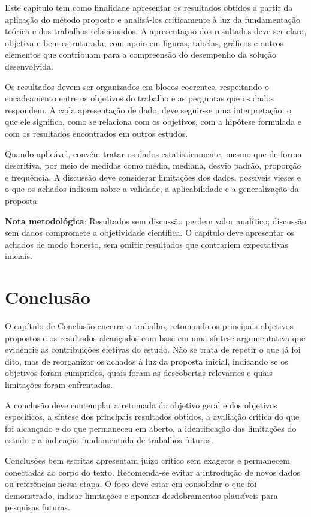 \documentclass{eic-bcc-tcc}
\begin{document}
Este capítulo tem como finalidade apresentar os resultados obtidos a partir da aplicação do método proposto e analisá-los criticamente à luz da fundamentação teórica e dos trabalhos relacionados. A apresentação dos resultados deve ser clara, objetiva e bem estruturada, com apoio em figuras, tabelas, gráficos e outros elementos que contribuam para a compreensão do desempenho da solução desenvolvida.

Os resultados devem ser organizados em blocos coerentes, respeitando o encadeamento entre os objetivos do trabalho e as perguntas que os dados respondem. A cada apresentação de dado, deve seguir-se uma interpretação: o que ele significa, como se relaciona com os objetivos, com a hipótese formulada e com os resultados encontrados em outros estudos.

Quando aplicável, convém tratar os dados estatisticamente, mesmo que de forma descritiva, por meio de medidas como média, mediana, desvio padrão, proporção e frequência. A discussão deve considerar limitações dos dados, possíveis vieses e o que os achados indicam sobre a validade, a aplicabilidade e a generalização da proposta.

\textbf{Nota metodológica}: Resultados sem discussão perdem valor analítico; discussão sem dados compromete a objetividade científica. O capítulo deve apresentar os achados de modo honesto, sem omitir resultados que contrariem expectativas iniciais.


\chapter{Conclusão}
\label{cha:conclusao}

O capítulo de Conclusão encerra o trabalho, retomando os principais objetivos propostos e os resultados alcançados com base em uma síntese argumentativa que evidencie as contribuições efetivas do estudo. Não se trata de repetir o que já foi dito, mas de reorganizar os achados à luz da proposta inicial, indicando se os objetivos foram cumpridos, quais foram as descobertas relevantes e quais limitações foram enfrentadas.

A conclusão deve contemplar a retomada do objetivo geral e dos objetivos específicos, a síntese dos principais resultados obtidos, a avaliação crítica do que foi alcançado e do que permaneceu em aberto, a identificação das limitações do estudo e a indicação fundamentada de trabalhos futuros.

Conclusões bem escritas apresentam juízo crítico sem exageros e permanecem conectadas ao corpo do texto. Recomenda-se evitar a introdução de novos dados ou referências nessa etapa. O foco deve estar em consolidar o que foi demonstrado, indicar limitações e apontar desdobramentos plausíveis para pesquisas futuras.
\end{document}
